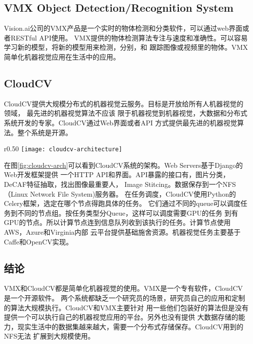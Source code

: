 \subsection{VMX Object Detection/Recognition System}
Vision.ai公司的VMX产品是一个实时的物体检测和分类软件，可以通过web界面或者RESTful API使用。
VMX提供的物体检测算法专注与速度和准确性。可以容易学习新的模型，将新的模型用来检测，分别，和
跟踪图像或视频里的物体。VMX简单化机器视觉应用在生活中的应用。

\subsection{CloudCV}
CloudCV提供大规模分布式的机器视觉云服务。目标是开放给所有人机器视觉的领域，
最先进的机器视觉算法不应该
限于机器视觉到机器视觉，大数据和分布式系统开发的专家。CloudCV通过Web界面或者API
方式提供最先进的机器视觉算法。整个系统是开源。\cite{cloudcv2015}

\begin{wrapfigure}{r}{0.50\textwidth}
  \centering
    \texttt{[image: cloudcv-architecture]}
    \caption{CloudCV系统架构。\cite{cloudcv2015}}
  \label{fig:cloudcv-arch}
\end{wrapfigure}
在图\ref{fig:cloudcv-arch}可以看到CloudCV系统的架构。Web Servers基于Django的Web开发框架提供
一个HTTP API和界面。API暴露的接口有，图片分类，DeCAF特征抽取，找出图像最重要人，
Image Stitcing。数据保存到一个NFS（Linux Network File System)服务器。
在任务调度，CloudCV使用Python的Celery框架，选定在哪个节点得跑具体的任务。
它们通过不同的queue可以调度任务到不同的节点组。按任务类型分Queue，这样可以调度需要GPU的任务
到有GPU的节点。所以计算节点连到信息队列收到该执行的任务。计算节点使用AWS，Azure和Virginia内部
云平台提供基础施舍资源。机器视觉任务主要基于Caffe和OpenCV实现。

\subsection{结论}
VMX和CloudCV都是简单化机器视觉的使用。VMX是一个专有软件，CloudCV是一个开源软件。
两个系统都缺乏一个研究员的场景，研究员自己的应用和定制的算法大规模执行。CloudCV和VMX主要针对
用一些他们包装好的算法但是没有提供一个可以执行自己的机器视觉应用的平台。另外也没有提供
大数据存储的能力，现实生活中的数据集越来越大，需要一个分布式存储保存。CloudCV用到的NFS无法
扩展到大规模使用。

